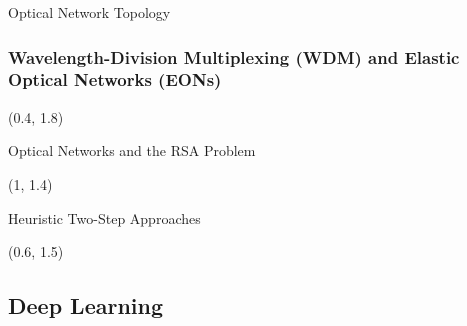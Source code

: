 \documentclass[english,aspectratio=169,dvipsnames]{beamer}
\begin{document}
\begin{frame}{Optical Network Topology}
    \vspace{0.2cm}
    \begin{figure}
    	\begin{adjustwidth}{0cm}{0cm}
    		\centering
    		
    	\end{adjustwidth}
    \end{figure}
\end{frame}

\begin{frame}
    \frametitle{\large Wavelength-Division Multiplexing (WDM) and Elastic Optical Networks (EONs)}
    \begin{textblock}{5}(0.4, 1.8)
        
    \end{textblock}
\end{frame}

\begin{frame}{Optical Networks and the RSA Problem}
	\begin{textblock}{5}(1, 1.4)
        
    \end{textblock}
\end{frame}

\begin{frame}{Heuristic Two-Step Approaches}
	\begin{textblock}{5}(0.6, 1.5)
        
    \end{textblock}
\end{frame}

\subsection{Deep Learning}
\end{document}
